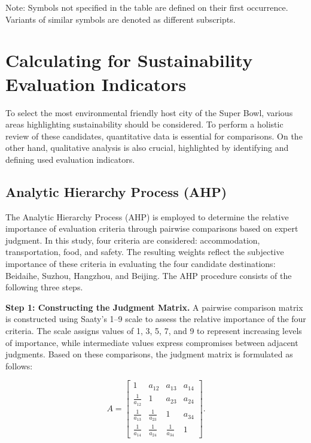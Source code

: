 \documentclass{mcmthesis}
\begin{document}
Note: Symbols not specified in the table are defined on their first occurrence. Variants of similar symbols are denoted as different subscripts. 

\section{Calculating for Sustainability Evaluation Indicators} \label{sec:indicators}

To select the most environmental friendly host city of the Super Bowl, various areas highlighting sustainability should be considered. To perform a holistic review of these candidates, quantitative data is essential for comparisons. On the other hand, qualitative analysis is also crucial, highlighted by identifying and defining used evaluation indicators. 

\subsection{Analytic Hierarchy Process (AHP)}

The Analytic Hierarchy Process (AHP) is employed to determine the relative importance of evaluation criteria through pairwise comparisons based on expert judgment. In this study, four criteria are considered: accommodation, transportation, food, and safety. The resulting weights reflect the subjective importance of these criteria in evaluating the four candidate destinations: Beidaihe, Suzhou, Hangzhou, and Beijing. The AHP procedure consists of the following three steps.

\noindent\textbf{Step 1: Constructing the Judgment Matrix.}
A pairwise comparison matrix is constructed using Saaty's 1--9 scale to assess the relative importance of the four criteria. The scale assigns values of 1, 3, 5, 7, and 9 to represent increasing levels of importance, while intermediate values express compromises between adjacent judgments. Based on these comparisons, the judgment matrix is formulated as follows:

\begin{equation}
A =
\begin{bmatrix}
1 & a_{12} & a_{13} & a_{14} \\
\frac{1}{a_{12}} & 1 & a_{23} & a_{24} \\
\frac{1}{a_{13}} & \frac{1}{a_{23}} & 1 & a_{34} \\
\frac{1}{a_{14}} & \frac{1}{a_{24}} & \frac{1}{a_{34}} & 1
\end{bmatrix}.
\end{equation}
\end{document}
